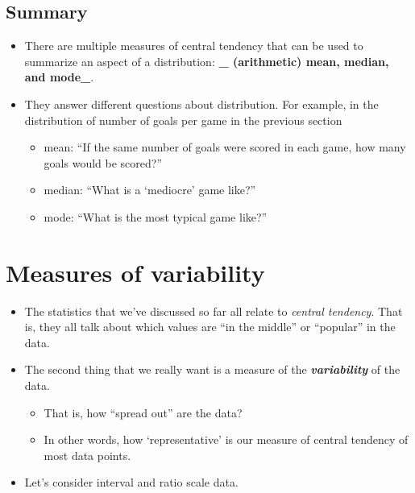 \documentclass[
]{book}
\providecommand{\tightlist}{%
  \setlength{\itemsep}{0pt}\setlength{\parskip}{0pt}}
\begin{document}
\hypertarget{summary}{%
\subsection{Summary}\label{summary}}

\begin{itemize}
\tightlist
\item
  There are multiple measures of central tendency that can be used to summarize an aspect of a distribution: \textbf{\_ (arithmetic) mean, median, and mode\_}.
\item
  They answer different questions about distribution. For example, in the distribution of number of goals per game in the previous section

  \begin{itemize}
  \tightlist
  \item
    mean: ``If the same number of goals were scored in each game, how many goals would be scored?''
  \item
    median: ``What is a `mediocre' game like?''
  \item
    mode: ``What is the most typical game like?''
  \end{itemize}
\end{itemize}

\hypertarget{var}{%
\section{Measures of variability}\label{var}}

\begin{itemize}
\tightlist
\item
  The statistics that we've discussed so far all relate to \emph{central tendency}. That is, they all talk about which values are ``in the middle'' or ``popular'' in the data.
\item
  The second thing that we really want is a measure of the \textbf{\emph{variability}} of the data.

  \begin{itemize}
  \tightlist
  \item
    That is, how ``spread out'' are the data?
  \item
    In other words, how `representative' is our measure of central tendency of most data points.
  \end{itemize}
\item
  Let's consider interval and ratio scale data.
\end{itemize}
\end{document}
